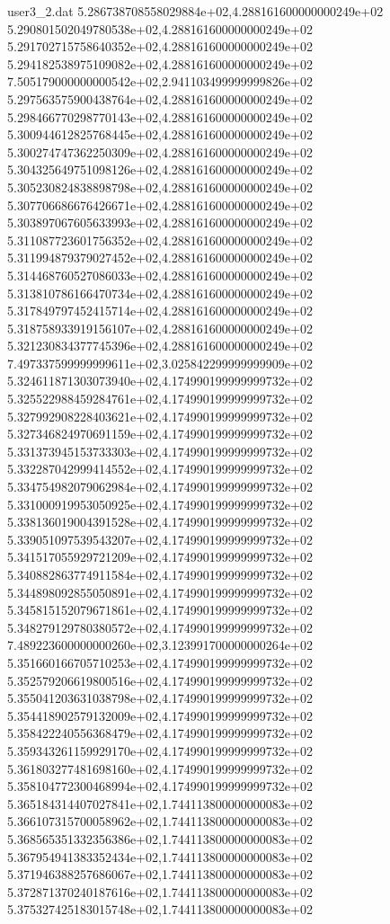 \begin{filecontents}{user3_2.dat}
5.286738708558029884e+02,4.288161600000000249e+02
5.290801502049780538e+02,4.288161600000000249e+02
5.291702715758640352e+02,4.288161600000000249e+02
5.294182538975109082e+02,4.288161600000000249e+02
7.505179000000000542e+02,2.941103499999999826e+02
5.297563575900438764e+02,4.288161600000000249e+02
5.298466770298770143e+02,4.288161600000000249e+02
5.300944612825768445e+02,4.288161600000000249e+02
5.300274747362250309e+02,4.288161600000000249e+02
5.304325649751098126e+02,4.288161600000000249e+02
5.305230824838898798e+02,4.288161600000000249e+02
5.307706686676426671e+02,4.288161600000000249e+02
5.303897067605633993e+02,4.288161600000000249e+02
5.311087723601756352e+02,4.288161600000000249e+02
5.311994879379027452e+02,4.288161600000000249e+02
5.314468760527086033e+02,4.288161600000000249e+02
5.313810786166470734e+02,4.288161600000000249e+02
5.317849797452415714e+02,4.288161600000000249e+02
5.318758933919156107e+02,4.288161600000000249e+02
5.321230834377745396e+02,4.288161600000000249e+02
7.497337599999999611e+02,3.025842299999999909e+02
5.324611871303073940e+02,4.174990199999999732e+02
5.325522988459284761e+02,4.174990199999999732e+02
5.327992908228403621e+02,4.174990199999999732e+02
5.327346824970691159e+02,4.174990199999999732e+02
5.331373945153733303e+02,4.174990199999999732e+02
5.332287042999414552e+02,4.174990199999999732e+02
5.334754982079062984e+02,4.174990199999999732e+02
5.331000919953050925e+02,4.174990199999999732e+02
5.338136019004391528e+02,4.174990199999999732e+02
5.339051097539543207e+02,4.174990199999999732e+02
5.341517055929721209e+02,4.174990199999999732e+02
5.340882863774911584e+02,4.174990199999999732e+02
5.344898092855050891e+02,4.174990199999999732e+02
5.345815152079671861e+02,4.174990199999999732e+02
5.348279129780380572e+02,4.174990199999999732e+02
7.489223600000000260e+02,3.123991700000000264e+02
5.351660166705710253e+02,4.174990199999999732e+02
5.352579206619800516e+02,4.174990199999999732e+02
5.355041203631038798e+02,4.174990199999999732e+02
5.354418902579132009e+02,4.174990199999999732e+02
5.358422240556368479e+02,4.174990199999999732e+02
5.359343261159929170e+02,4.174990199999999732e+02
5.361803277481698160e+02,4.174990199999999732e+02
5.358104772300468994e+02,4.174990199999999732e+02
5.365184314407027841e+02,1.744113800000000083e+02
5.366107315700058962e+02,1.744113800000000083e+02
5.368565351332356386e+02,1.744113800000000083e+02
5.367954941383352434e+02,1.744113800000000083e+02
5.371946388257686067e+02,1.744113800000000083e+02
5.372871370240187616e+02,1.744113800000000083e+02
5.375327425183015748e+02,1.744113800000000083e+02

\end{filecontents}
